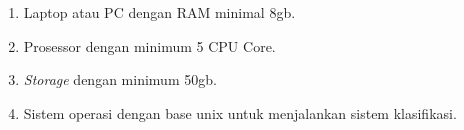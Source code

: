 \begin{enumerate}
    \item Laptop atau PC dengan RAM minimal 8gb.
    \item Prosessor dengan minimum 5 CPU Core.
    \item \textit{Storage} dengan minimum 50gb.
    \item Sistem operasi dengan base unix untuk menjalankan sistem klasifikasi.
\end{enumerate}
